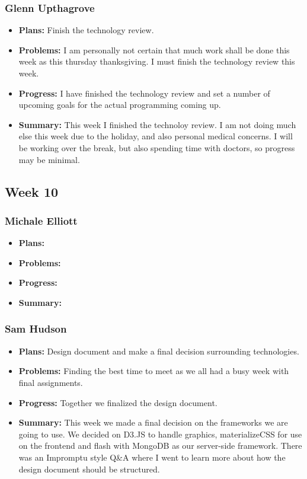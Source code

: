 \documentclass[onecolumn, draftclsnofoot,10pt, compsoc]{IEEEtran}
\begin{document}
\subsubsection{Glenn Upthagrove}
\begin {itemize}
 \item \textbf{Plans: }Finish the technology review. 
 \item \textbf{Problems: }I am personally not certain that much work shall be done this week as this thursday thanksgiving. I must finish the technology review this week.
 \item \textbf{Progress: }I have finished the technology review and set a number of upcoming goals for the actual programming coming up. 
 \item \textbf{Summary: }This week I finished the technoloy review. I am not doing much else this week due to the holiday, and also personal medical concerns. I will be working over the break, but also spending time with doctors, so progress may be minimal. 
\end {itemize}
\subsection {Week 10}
\subsubsection{Michale Elliott}
\begin {itemize}
 \item \textbf{Plans: }
 \item \textbf{Problems: }
 \item \textbf{Progress: }
 \item \textbf{Summary: }
\end {itemize}
\subsubsection{Sam Hudson}
\begin {itemize}
\item \textbf{Plans: }Design document and make a final decision surrounding technologies.
\item \textbf{Problems: }Finding the best time to meet as we all had a busy week with final assignments.
\item \textbf{Progress: }Together we finalized the design document.
\item \textbf{Summary: }This week we made a final decision on the frameworks we are going to use. We decided on D3.JS to handle graphics, materializeCSS for use on the frontend and flash with MongoDB as our server-side framework. There was an Impromptu style Q\&A where I went to learn more about how the design document should be structured. 
\end {itemize}
\end{document}
